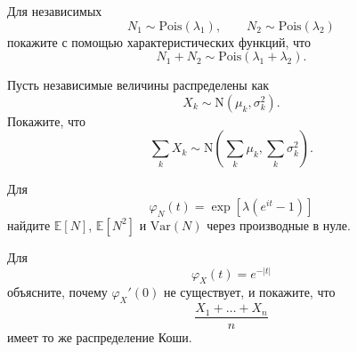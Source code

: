 \documentclass[
  russian,
  11pt,
  a4paper,
  open=any]{scrbook}
\begin{document}
\begin{semanticpdfbox}[colback=BookCoralSoft,borderline west={1.2mm}{0pt}{BookCoral}]

\par\nopagebreak[4]\vspace{1.2mm}

Для независимых \[
N_1\sim\mathrm{Pois}(\lambda_1),\qquad
N_2\sim\mathrm{Pois}(\lambda_2)
\] покажите с помощью характеристических функций, что \[
N_1+N_2\sim\mathrm{Pois}(\lambda_1+\lambda_2).
\]

\end{semanticpdfbox}

\begin{semanticpdfbox}[colback=BookCoralSoft,borderline west={1.2mm}{0pt}{BookCoral}]

\par\nopagebreak[4]\vspace{1.2mm}

Пусть независимые величины распределены как \[
X_k\sim\mathrm{N}(\mu_k,\sigma_k^2).
\] Покажите, что \[
\sum_kX_k
\sim
\mathrm{N}\!\left(\sum_k\mu_k,\sum_k\sigma_k^2\right).
\]

\end{semanticpdfbox}

\begin{semanticpdfbox}[colback=BookCoralSoft,borderline west={1.2mm}{0pt}{BookCoral}]

\par\nopagebreak[4]\vspace{1.2mm}

Для \[
\varphi_N(t)=\exp\!\left[\lambda(e^{it}-1)\right]
\] найдите \(\mathbb{E}[N]\), \(\mathbb{E}[N^2]\) и \(\mathrm{Var}(N)\)
через производные в нуле.

\end{semanticpdfbox}

\begin{semanticpdfbox}[colback=BookCoralSoft,borderline west={1.2mm}{0pt}{BookCoral}]

\par\nopagebreak[4]\vspace{1.2mm}

Для \[
\varphi_X(t)=e^{-|t|}
\] объясните, почему \(\varphi_X'(0)\) не существует, и покажите, что \[
\frac{X_1+\dots+X_n}{n}
\] имеет то же распределение Коши.

\end{semanticpdfbox}
\end{document}
